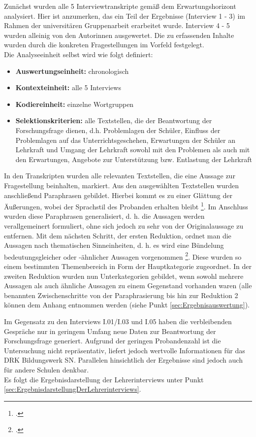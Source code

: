 Zunächst wurden alle 5 Interviewtranskripte gemäß dem Erwartungshorizont analysiert. Hier ist anzumerken, das ein Teil der Ergebnisse (Interview 1 - 3) im Rahmen der universitären Gruppenarbeit erarbeitet wurde. Interview 4 - 5 wurden alleinig von den Autorinnen ausgewertet. Die zu erfassenden Inhalte wurden durch die konkreten  Fragestellungen im Vorfeld festgelegt.\\

\noindent
Die Analyseeinheit selbst wird wie folgt definiert:

\begin{itemize}
	\item \textbf{Auswertungseinheit:} chronologisch
	\item \textbf{Kontexteinheit:} alle 5 Interviews
	\item \textbf{Kodiereinheit:} einzelne Wortgruppen
	\item \textbf{Selektionskriterien:} alle Textstellen, die der Beantwortung der Forschungsfrage dienen, d.h. Problemlagen der Schüler, Einfluss der Problemlagen auf das Unterrichtsgeschehen, Erwartungen der Schüler an Lehrkraft und Umgang der Lehrkraft sowohl mit den Problemen als auch mit den Erwartungen, Angebote zur Unterstützung bzw. Entlastung der Lehrkraft
\end{itemize}

\noindent
In den Transkripten wurden alle relevanten Textstellen, die eine Aussage zur Fragestellung beinhalten, markiert. Aus den ausgewählten Textstellen wurden anschließend Paraphrasen gebildet. Hierbei kommt es zu einer Glättung der Äußerungen, wobei der Sprachstil des Probanden erhalten bleibt \footcite[vgl.][138]{Krueger2014}. Im Anschluss wurden diese Paraphrasen generalisiert, d. h. die Aussagen werden verallgemeinert formuliert, ohne sich jedoch zu sehr von der Originalaussage zu entfernen. Mit dem nächsten Schritt, der ersten Reduktion, ordnet man die Aussagen nach thematischen Sinneinheiten, d. h. es wird eine Bündelung bedeutungsgleicher oder -ähnlicher Aussagen vorgenommen \footcite[vgl.][139]{Krueger2014}. Diese wurden so einem bestimmten Themenbereich in Form der Hauptkategorie zugeordnet. In der zweiten Reduktion wurden nun Unterkategorien gebildet, wenn sowohl mehrere Aussagen als auch ähnliche Aussagen zu einem Gegenstand vorhanden waren (alle benannten Zwischenschritte von der Paraphrasierung bis hin zur Reduktion 2 können dem Anhang entnommen werden (siehe Punkt \ref{sec:Ergebnisauswertung}).

Im Gegensatz zu den Interviews I.01/I.03 und I.05 haben die verbleibenden Gespräche nur in geringem Umfang neue Daten zur Beantwortung der Forschungsfrage generiert. Aufgrund der geringen Probandenzahl ist die Untersuchung nicht repräsentativ, liefert jedoch wertvolle Informationen für das DRK Bildungswerk SN. Parallelen hinsichtlich der Ergebnisse sind jedoch auch für andere Schulen denkbar.\\

\noindent
Es folgt die Ergebnisdarstellung der Lehrerinterviews unter Punkt \ref{sec:ErgebnisdarstellungDerLehrerinterviews}.